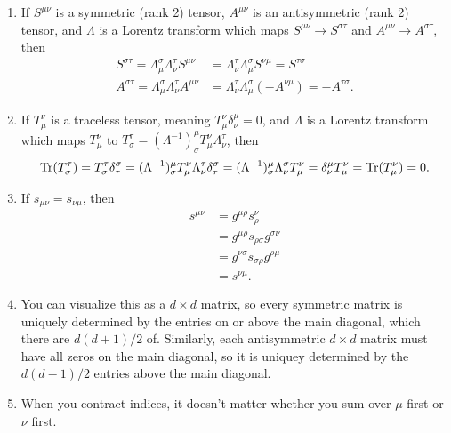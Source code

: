 \documentclass{article}
\begin{document}
\begin{enumerate}[label=(\alph*)]
    \item If $S^{\mu \nu}$ is a symmetric (rank 2) tensor, $A^{\mu \nu}$ is an antisymmetric (rank 2) tensor, and $\Lambda$ is a Lorentz transform which maps $S^{\mu \nu} \rightarrow S^{\sigma \tau}$ and $A^{\mu \nu} \rightarrow A^{\sigma \tau}$, then
        \begin{align*}
            S^{\sigma \tau} = \Lambda_\mu^\sigma \Lambda_\nu^\tau S^{\mu \nu} &= \Lambda_\nu^\tau \Lambda_\mu^\sigma S^{\nu \mu} = S^{\tau \sigma} \\
            A^{\sigma \tau} = \Lambda_\mu^\sigma \Lambda_\nu^\tau A^{\mu \nu} &= \Lambda_\nu^\tau \Lambda_\mu^\sigma (- A^{\nu \mu}) = - A^{\tau \sigma}.
        \end{align*}
    \item If $T_\mu^\nu$ is a traceless tensor, meaning $T_\mu^\nu \delta_\nu^\mu = 0$, and $\Lambda$ is a Lorentz transform which maps $T_\mu^\nu$ to $T_\sigma^\tau = (\Lambda^{-1})_\sigma^\mu T_\mu^\nu \Lambda_\nu^\tau$, then
        \[ \operatorname{Tr}(T_\sigma^\tau) = T_\sigma^\tau \delta_\tau^\sigma = (\Lambda^{-1})_\sigma^\mu T_\mu^\nu \Lambda_\nu^\tau \delta_\tau^\sigma = (\Lambda^{-1})_\sigma^\mu \Lambda_\nu^\sigma T_\mu^\nu = \delta_\nu^\mu T_\mu^\nu = \operatorname{Tr}(T_\mu^\nu) = 0. \]
    \item If $s_{\mu \nu} = s_{\nu \mu}$, then
        \begin{align*}
            s^{\mu \nu} &= g^{\mu \rho} s_\rho^\nu \\
                        &= g^{\mu \rho} s_{\rho \sigma} g^{\sigma \nu} \\
                        &= g^{\nu \sigma} s_{\sigma \rho} g^{\rho \mu} \\
                        &= s^{\nu \mu}.
        \end{align*}
    \item You can visualize this as a $d \times d$ matrix, so every symmetric matrix is uniquely determined by the entries on or above the main diagonal, which there are $d(d+1)/2$ of. Similarly, each antisymmetric $d \times d$ matrix must have all zeros on the main diagonal, so it is uniquey determined by the $d(d-1)/2$ entries above the main diagonal.
    \item When you contract indices, it doesn't matter whether you sum over $\mu$ first or $\nu$ first.
\end{enumerate}
\end{document}
